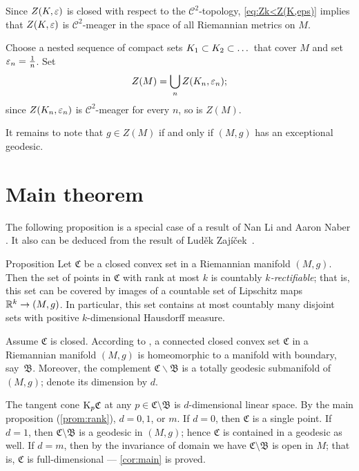 \documentclass[a4paper,10pt]{article}
\begin{document}
Since $Z(K,\varepsilon)$ is closed with respect to the $\mathcal C^2$-topology, \ref{eq:Zk<Z(K,eps)} implies that $Z(K,\varepsilon)$ is $\mathcal{C}^2$-meager in the space of all Riemannian metrics on $M$.


Choose a nested sequence of compact sets $K_1\z\subset K_2\subset \dots$ that cover $M$ and set $\varepsilon_n=\tfrac1n$.
Set 
\[Z(M)=\bigcup_n Z(K_n,\varepsilon_n);\]
since $Z(K_n,\varepsilon_n)$ is $\mathcal{C}^2$-meager for every $n$, so is $Z(M)$.

It remains to note that $g\in Z(M)$ if and only if $(M,g)$ has an exceptional geodesic.
\qeds


\section{Main theorem}

The following proposition is a special case of a result of Nan Li and Aaron Naber \cite[Theorem 1.6]{li-naber}.
It also can be deduced from the result of Luděk 
Zajíček~\cite{zajicek}.

\begin{thm}{Proposition}\label{prop:rectifiable}
Let $\mathfrak{C}$ be a closed convex set in a Riemannian manifold $(M,g)$.
Then the set of points in $\mathfrak{C}$ with rank at most $k$ is countably \emph{$k$-rectifiable};
that is, this set can be  covered by images of a countable set of Lipschitz maps $\mathbb{R}^k\to (M,g)$.
In particular, this set contains at most countably many disjoint sets with positive $k$-dimensional Hausdorff measure.
\end{thm}

Assume $\mathfrak{C}$ is closed.
According to \cite[Theorem 1.6]{cheeger-gromoll}, a connected closed convex set $\mathfrak{C}$ in a Riemannian manifold $(M,g)$ is homeomorphic to a manifold with boundary, say~$\mathfrak{B}$.
Moreover, the complement $\mathfrak{C}\backslash \mathfrak{B}$ is a totally geodesic submanifold of $(M,g)$; denote its dimension by $d$.

The tangent cone $\mathrm{K}_p \mathfrak C$ at any $p \in \mathfrak C\setminus \mathfrak B$ is $d$-dimensional linear space.
By the main proposition (\ref{prom:rank}), $d=0, 1$, or $m$.
If $d=0$, then $\mathfrak{C}$ is a single point.
If $d=1$, then $\mathfrak C\setminus \mathfrak B$ is a  geodesic in $(M,g)$;
hence $\mathfrak C$ is contained in a  geodesic as well.
If $d=m$, then by the invariance of domain we have  $\mathfrak C\setminus \mathfrak B$ is open in $M$; that is, $\mathfrak C$ is full-dimensional --- \ref{cor:main} is proved.
\end{document}
